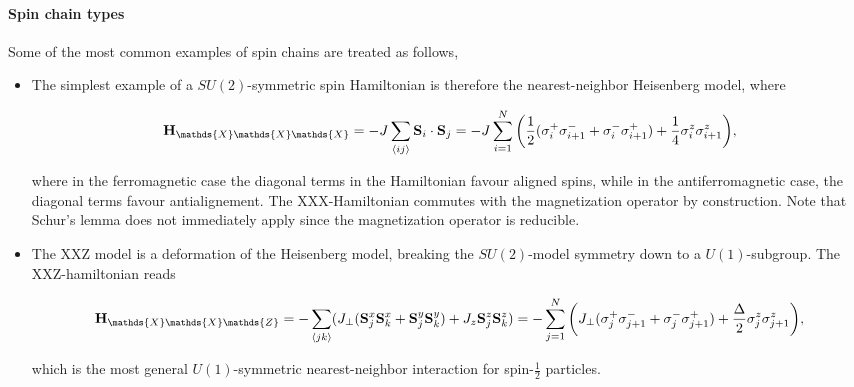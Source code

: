 \documentclass{homework}
\begin{document}
\paragraph{\textbf{Spin chain types}}

Some of the most common examples of spin chains are treated as follows, 

\begin{itemize}
    \item The simplest example of a $SU(2)$-symmetric spin Hamiltonian is therefore the nearest-neighbor Heisenberg model, where 

\begin{equation}
    \Hamiltonian_{\mathds{X}\mathds{X}\mathds{X}} = -J \sum_{\langle ij \rangle} {\spin}_i \cdot {\spin}_j = -J \sum_{i=1}^{N} \bigg(\frac{1}{2} (\sigma_i^+ \sigma_{i+1}^{-} + \sigma_i^- \sigma_{i+1}^+) + \frac{1}{4} \sigma_i^z \sigma_{i+1}^z\bigg),
\end{equation}

where in the ferromagnetic case the diagonal terms in the Hamiltonian favour aligned spins, while in the antiferromagnetic case, the diagonal terms favour antialignement. The XXX-Hamiltonian commutes with the magnetization operator by construction. Note that Schur's lemma does not immediately apply since the magnetization operator is reducible. \\

\item The XXZ model is a deformation of the Heisenberg model, breaking the $SU(2)$-model symmetry down to a $U(1)$-subgroup. The XXZ-hamiltonian reads

\begin{equation}
    \Hamiltonian_{\mathds{X}\mathds{X}\mathds{Z}} = - \sum_{\langle jk \rangle} (J_\perp (\spin_j^x \spin_k^x + \spin_j^y \spin_k^y) + J_z \spin_j^z \spin_k^z) = - \sum_{j=1}^{N} \bigg( J_\perp (\sigma_{j}^+ \sigma_{j+1}^- + \sigma_{j}^- \sigma_{j+1}^+) + \frac{\Delta}{2} \sigma_j^z \sigma_{j+1}^z \bigg),
    \label{XXZ hamiltonian}
\end{equation}

which is the most general $U(1)$-symmetric nearest-neighbor interaction for spin-$\frac{1}{2}$ particles. \\


\end{itemize}
\end{document}
